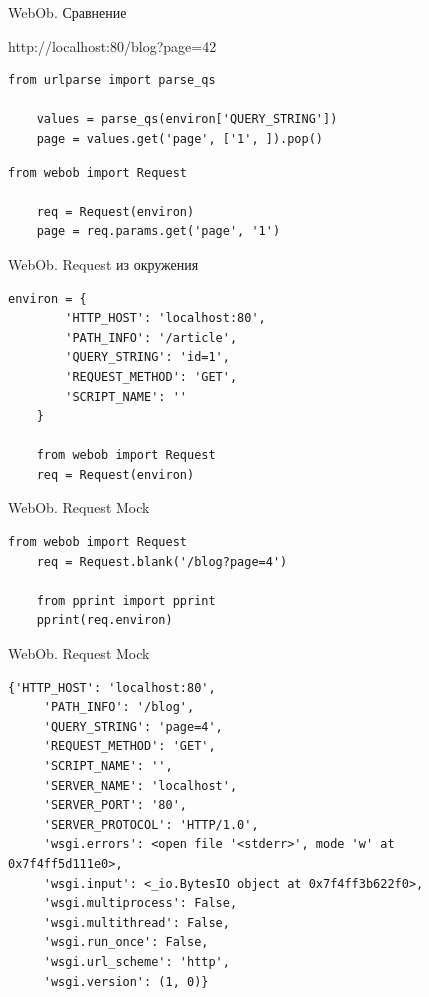 \begin{frame}[fragile]{WebOb. Сравнение}

  http://localhost:80/blog?page=42

  \begin{lstlisting}[style=python]
    from urlparse import parse_qs

    values = parse_qs(environ['QUERY_STRING'])
    page = values.get('page', ['1', ]).pop()
  \end{lstlisting}

  \begin{lstlisting}[style=python]
    from webob import Request

    req = Request(environ)
    page = req.params.get('page', '1')
  \end{lstlisting}

\end{frame}


\begin{frame}[fragile]{WebOb. Request из окружения}

  \begin{lstlisting}[style=python]
    environ = {
        'HTTP_HOST': 'localhost:80',
        'PATH_INFO': '/article',
        'QUERY_STRING': 'id=1',
        'REQUEST_METHOD': 'GET',
        'SCRIPT_NAME': ''
    }

    from webob import Request
    req = Request(environ)
  \end{lstlisting}

\end{frame}

\begin{frame}[fragile]{WebOb. Request Mock}

  \begin{lstlisting}[style=python]
    from webob import Request
    req = Request.blank('/blog?page=4')

    from pprint import pprint
    pprint(req.environ)
  \end{lstlisting}

\end{frame}


\begin{frame}[fragile]{WebOb. Request Mock}

  \begin{lstlisting}[style=python]
    {'HTTP_HOST': 'localhost:80',
     'PATH_INFO': '/blog',
     'QUERY_STRING': 'page=4',
     'REQUEST_METHOD': 'GET',
     'SCRIPT_NAME': '',
     'SERVER_NAME': 'localhost',
     'SERVER_PORT': '80',
     'SERVER_PROTOCOL': 'HTTP/1.0',
     'wsgi.errors': <open file '<stderr>', mode 'w' at 0x7f4ff5d111e0>,
     'wsgi.input': <_io.BytesIO object at 0x7f4ff3b622f0>,
     'wsgi.multiprocess': False,
     'wsgi.multithread': False,
     'wsgi.run_once': False,
     'wsgi.url_scheme': 'http',
     'wsgi.version': (1, 0)}
  \end{lstlisting}

\end{frame}

